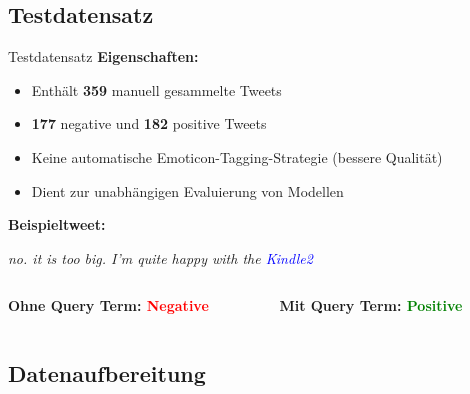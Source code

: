 \documentclass[aspectratio=169]{beamer} %
\begin{document}
\subsection{Testdatensatz}
\begin{frame}{Testdatensatz}
  \textbf{Eigenschaften:}
  \begin{itemize}
      \item Enthält \textbf{359} manuell gesammelte Tweets
      \item \textbf{177} negative und \textbf{182} positive Tweets
      \item Keine automatische Emoticon-Tagging-Strategie (bessere Qualität)
      \item Dient zur unabhängigen Evaluierung von Modellen
  \end{itemize}

  \vspace{0.5cm}
  \textbf{Beispieltweet:}
  

  \begin{center}
    \glqq \textit{no. it is too big. I'm quite happy with the \textcolor{blue}{Kindle2}\grqq}
    \vspace{0.25cm}
    \begin{columns}
        \begin{column}{0.45\textwidth}
            \textbf{Ohne Query Term: \textcolor{red}{Negative}} 
        \end{column}
        \begin{column}{0.45\textwidth}
            \textbf{Mit Query Term: \textcolor{green}{Positive}} 
        \end{column}
    \end{columns}
  \end{center}
\end{frame}

\subsection{Datenaufbereitung}
\end{document}
